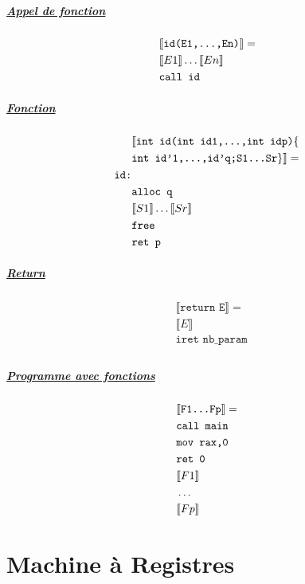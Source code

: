 \documentclass[12pt,twocolumn]{report}
\begin{document}
\begin{trad}
    \paragraph*{ \underline{Appel de fonction}}
    \begin{align*}
        &\llbracket \texttt{id(E1,\dots,En)} \rrbracket = \\
        &\llbracket E1 \rrbracket \dots \llbracket En \rrbracket\\
        &\texttt{call id}\\
    \end{align*}
\end{trad}
\begin{trad}
    \paragraph*{ \underline{Fonction}}
    \begin{align*}
        &\llbracket \texttt{int id(int id1,\dots,int idp)}\lbrace \\
        &\texttt{int id'1,\dots,id'q;S1\dots Sr} \rbrace \rrbracket =\\
        \texttt{id:}&\\
        &\texttt{alloc q}\\
        &\llbracket S1 \rrbracket \dots \llbracket Sr \rrbracket\\
        &\texttt{free}\\
        &\texttt{ret p}
    \end{align*}
\end{trad}
\begin{trad}
    \paragraph*{ \underline{Return}}
    \begin{align*}
        &\llbracket \texttt{return E} \rrbracket = \\
        &\llbracket E \rrbracket\\
        &\texttt{iret nb\_param}\\
    \end{align*}
\end{trad}
\begin{trad}
    \paragraph*{ \underline{Programme avec fonctions}}
    \begin{align*}
        &\llbracket \texttt{F1\dots Fp} \rrbracket = \\
        &\texttt{call main}\\
        &\texttt{mov rax,0}\\
        &\texttt{ret 0}\\
        &\llbracket F1 \rrbracket\\
        & \dots\\
        &\llbracket Fp \rrbracket\\
    \end{align*}
\end{trad}

\chapter*{Machine à Registres}
\end{document}
